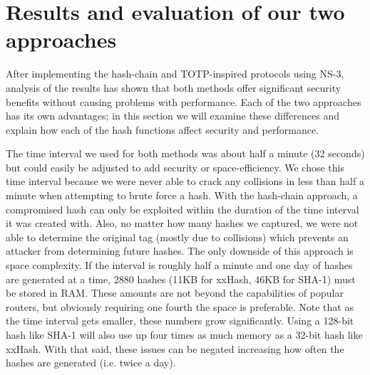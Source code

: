 \documentclass[12pt]{article} %
\begin{document}

\newpage %



\section{Results and evaluation of our two approaches}

After implementing the hash-chain and TOTP-inspired protocols using NS-3, analysis of the results has shown that both methods offer significant security benefits without causing problems with performance. Each of the two approaches has its own advantages; in this section we will examine these differences and explain how each of the hash functions affect security and performance.

The time interval we used for both methods was about half a minute (32 seconds) but could easily be adjusted to add security or space-efficiency. We chose this time interval because we were never able to crack any collisions in less than half a minute when attempting to brute force a hash. With the hash-chain approach, a compromised hash can only be exploited within the duration of the time interval it was created with. Also, no matter how many hashes we captured, we were not able to determine the original tag (mostly due to collisions) which prevents an attacker from determining future hashes. The only downside of this approach is space complexity. If the interval is roughly half a minute and one day of hashes are generated at a time, 2880 hashes (11KB for xxHash, 46KB for SHA-1) must be stored in RAM. These amounts are not beyond the capabilities of popular routers, but obviously requiring one fourth the space is preferable. Note that as the time interval gets smaller, these numbers grow significantly. Using a 128-bit hash like SHA-1 will also use up four times as much memory as a 32-bit hash like xxHash. With that said, these issues can be negated increasing how often the hashes are generated (i.e. twice a day).
\end{document}
